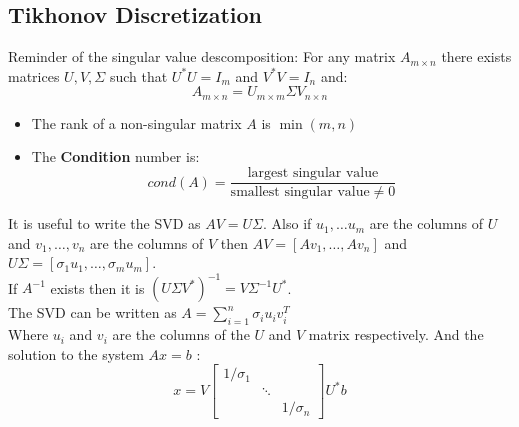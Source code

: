 \subsection{Tikhonov Discretization}
Reminder of the singular value descomposition: For any matrix $A_{m\times n} $ there exists matrices $U,V,\Sigma$ such that $U^*U=I_m$ and $V^*V=I_n$ and:
$$A_{m\times n}= U_{m\times m}\Sigma V_{n\times n} $$
\begin{remarks}
\begin{itemize}
\item The rank of  a non-singular matrix $A$ is $\min(m,n)$ 
\item The \textbf{Condition} number is:
$$cond(A)=\frac{\text{largest singular value}}{\text{smallest singular value}\neq 0}$$
\end{itemize}
\end{remarks}
It is useful to write the SVD as $AV=U\Sigma$. Also if $u_1,\ldots u_m$ are the columns of $U$ and $v_1,\ldots, v_n$ are the columns of $V$ then $AV=[Av_1,\ldots, Av_n]$ and $U\Sigma = [\sigma_1 u_1,\ldots, \sigma_m u_m] $.\\
If $A ^{-1} $ exists then it is $(U\Sigma V^*)^{-1} = V\Sigma ^{-1} U^*$.\\
The SVD can be written as $A=\sum_{i=1}^n \sigma_iu_iv_i^T$ \\
Where $u_i$ and $v_i$ are the columns of the $U$ and $V$ matrix respectively.
And the solution to the system $Ax=b$ :
$$ x= V\begin{bmatrix} 1/\sigma_1 &   &   \\    & \ddots &  \\   &   &  1/\sigma_n \end{bmatrix} U^*b$$

